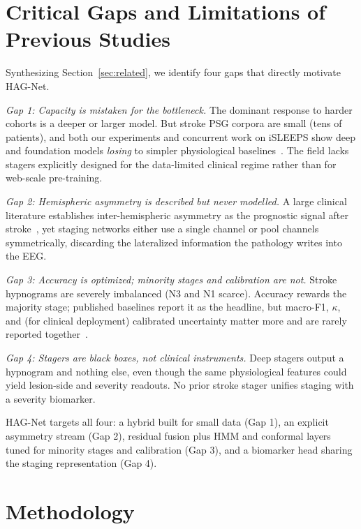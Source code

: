 \documentclass[journal]{IEEEtran}
\begin{document}
\section{Critical Gaps and Limitations of Previous Studies}
\label{sec:gaps}
Synthesizing Section~\ref{sec:related}, we identify four gaps that directly
motivate HAG-Net.

\emph{Gap 1: Capacity is mistaken for the bottleneck.} The dominant response to
harder cohorts is a deeper or larger model. But stroke PSG corpora are small (tens
of patients), and both our experiments and concurrent work on iSLEEPS show deep
and foundation models \emph{losing} to simpler physiological
baselines~\cite{bose2026gap,estevan2025ssl,sleepyland2026}. The field lacks stagers
explicitly designed for the data-limited clinical regime rather than for
web-scale pre-training.

\emph{Gap 2: Hemispheric asymmetry is described but never modelled.} A large
clinical literature establishes inter-hemispheric asymmetry as the prognostic
signal after stroke~\cite{gottselig2002stroke,anastasi2017bsi,simpson2023laterality},
yet staging networks either use a single channel or pool channels symmetrically,
discarding the lateralized information the pathology writes into the EEG.

\emph{Gap 3: Accuracy is optimized; minority stages and calibration are not.}
Stroke hypnograms are severely imbalanced (N3 and N1 scarce). Accuracy rewards the
majority stage; published baselines report it as the headline, but macro-F1,
$\kappa$, and (for clinical deployment) calibrated uncertainty matter
more and are rarely reported together~\cite{maiti2026isleeps,phan2022survey}.

\emph{Gap 4: Stagers are black boxes, not clinical instruments.} Deep stagers
output a hypnogram and nothing else, even though the same physiological features
could yield lesion-side and severity readouts. No prior stroke stager unifies
staging with a severity biomarker.

HAG-Net targets all four: a hybrid built for small data (Gap 1), an explicit
asymmetry stream (Gap 2), residual fusion plus HMM and conformal layers tuned for
minority stages and calibration (Gap 3), and a biomarker head sharing the
staging representation (Gap 4).

\section{Methodology}
\label{sec:method}
\end{document}

